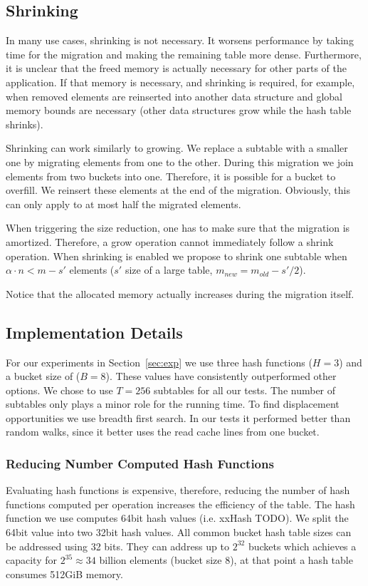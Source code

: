 \documentclass[a4paper,UKenglish]{lipics-v2016}
\begin{document}
\subsection{Shrinking}
In many use cases, shrinking is not necessary.  It worsens performance
by taking time for the migration and making the remaining table more
dense.  Furthermore, it is unclear that the freed memory is actually
necessary for other parts of the application.  If that memory is
necessary, and shrinking is required, for example, when removed
elements are reinserted into another data structure and global memory
bounds are necessary (other data structures grow while the hash table
shrinks).

Shrinking can work similarly to growing. We replace a subtable with a
smaller one by migrating elements from one to the other.  During this
migration we join elements from two buckets into one. Therefore, it is
possible for a bucket to overfill.  We reinsert these elements at the
end of the migration.  Obviously, this can only apply to at most half
the migrated elements.

When triggering the size reduction, one has to make sure that the
migration is amortized. Therefore, a grow operation cannot immediately
follow a shrink operation.  When shrinking is enabled we propose to
shrink one subtable when $\alpha\cdot n < m-s'$ elements ($s'$ size of a
large table, $m_{new} = m_{old} -s'/2$).

Notice that the allocated memory actually increases during the
migration itself.

\subsection{Implementation Details}
For our experiments in Section~\ref{sec:exp} we use three hash
functions ($H=3$) and a bucket size of ($B=8$). These values have
consistently outperformed other options.  We chose to use $T=256$
subtables for all our tests.  The number of subtables only plays a
minor role for the running time.  To find displacement opportunities
we use breadth first search.  In our tests it performed better than
random walks, since it better uses the read cache lines from one
bucket.

\subsubsection*{Reducing Number Computed Hash Functions}
Evaluating hash functions is expensive, therefore, reducing the number
of hash functions computed per operation increases the efficiency of
the table.  The hash function we use computes 64bit hash values
(i.e. xxHash TODO).  We split the 64bit value into two 32bit hash
values. All common bucket hash table sizes can be addressed using 32
bits. They can address up to $2^{32}$ buckets which achieves a
capacity for $2^{35} \approx 34$ billion elements (bucket size 8),
at that point a hash table consumes 512GiB memory.
\end{document}
